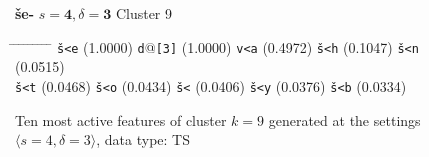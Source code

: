 \begin{figure}[!t] 
\begin{mdframed}
{\LARGE \textbf{\v{s}e-}} \hfill \large{$s=\textbf{4}, \delta=\textbf{3}$} \hfill Cluster 9\\
\vspace{-6pt}
\begin{normalsize}
\begin{tabbing}
\hspace{6ex} \= \hspace{10ex} \= \hspace{6ex} \= \hspace{10ex} \= \hspace{5ex} \= \hspace{10ex} \= \hspace{5ex} \= \hspace{10ex} \= \hspace{5ex} \= \hspace{9ex} \kill
\texttt{\v{s}<e} \> (1.0000) \> \texttt{d}@\texttt{[3]} \> (1.0000) \> \texttt{v<a} \> (0.4972) \> \texttt{\v{s}<h} \> (0.1047) \> \texttt{\v{s}<n} \> (0.0515) \\ 
\texttt{\v{s}<t} \> (0.0468) \> \texttt{\v{s}<o} \> (0.0434) \> \texttt{\v{s}<} \> (0.0406) \> \texttt{\v{s}<y} \> (0.0376) \> \texttt{\v{s}<b} \> (0.0334)
\end{tabbing}
\end{normalsize}
\label{fig:cluster-9-4-3-TS}
\caption{Ten most active features of cluster $k = 9$ generated at the settings $\langle{s}=4,\delta=3\rangle$, data type: TS}
\end{mdframed}
\end{figure}

